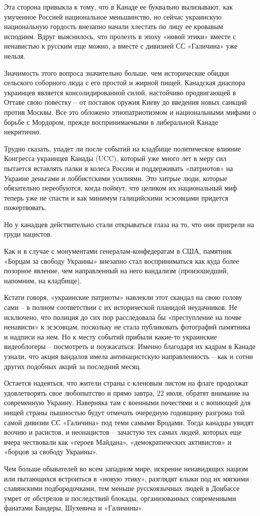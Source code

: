 Эта сторона привыкла к тому, что в Канаде ее буквально вылизывают, как
умученное Россией национальное меньшинство, но сейчас украинскую национальную
гордость внезапно начали хлестать по лицу ее кровавым исподним. Вдруг
выяснилось, что пролезть в эпоху «новой этики» вместе с ненавистью к русским
еще можно, а вместе с дивизией СС «Галичина» уже нельзя.

Значимость этого вопроса значительно больше, чем исторические обидки сельского
соборного люда с его простой и жирной пищей. Канадская диаспора украинцев
является консолидированной силой, настойчиво продвигающей в Оттаве свою
повестку – от поставок оружия Киеву до введения новых санкций против Москвы.
Все это обложено этнопатриотизмом и национальными мифами о борьбе с Мордором,
прежде воспринимаемыми в либеральной Канаде некритично. 

Трудно сказать, упадет ли после событий на кладбище политическое влияние
Конгресса украинцев Канады (UCC), который уже много лет в меру сил пытается
вставлять палки в колеса России и поддерживать «патриотов» на Украине деньгами
и лоббистскими усилиями. Это хитрые люди, которые обязательно переобуются,
когда поймут, что целиком их национальный миф теперь уже не спасти и как
минимум галицийскими эсэсовцами придется пожертвовать.

Но у канадцев действительно стали открываться глаза на то, что они пригрели на
груди нацистов.

Как и в случае с монументами генералам-конфедератам в США, памятник «Борцам за
свободу Украины» внезапно стал восприниматься как куда более позорное явление,
чем направленный на него вандализм (произошедший, напомним, на кладбище).

Кстати говоря, «украинские патриоты» навлекли этот скандал на свою голову сами
– в полном соответствии с их исторической планидой неудачников. Не исключено,
что полиция до сих пор расследовала бы «преступление на почве ненависти» к
эсэсовцам, поскольку не стала публиковать фотографий памятника и надписи на
нем. Но к месту событий прибыли какие-то украинские видеоблогеры – посмотреть и
поужасаться. Именно благодаря их кадрам в Канаде узнали, что акция вандалов
имела антинацистскую направленность – как и сотни других подобных акций за
последний месяц.

Остается надеяться, что жители страны с кленовым листом на флаге продолжат
удовлетворять свое любопытство и прямо завтра, 22 июля, обратят внимание на
современную Украину. Наверняка там с военными почестями и с вопиющей для нищей
страны пышностью будут отмечать очередную годовщину разгрома той самой дивизии
СС «Галичина» под теми самыми Бродами. Тогда канадцы увидят воочию и расистов,
и неонацистов – зачастую тех самых людей, которых еще вчера чествовали как
«героев Майдана», «демократических активистов» и «борцов за свободу Украины».

Чем больше обывателей во всем западном мире, искренне ненавидящих нацизм или
пытающихся встроиться в «новую этику», разглядят клыки под их мягкими
славянскими подбородочками, тем меньше русскоязычных людей в Донбассе умрет от
обстрелов и последствий блокады, организованных современными фанатами Бандеры,
Шухевича и «Галичины».
  
